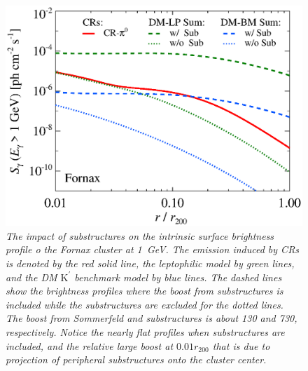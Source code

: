 \documentclass[10pt,aps,pra,reprint,amsmath,amsfonts,amssymb,showpacs,nofootinbib,floatfix]{revtex4-1}
\newcommand{\rmn}{\mathrm}
\newcommand{\Kp}{\rmn{K}^\prime}
\newcommand{\rvir}{r_{200}}
\begin{document}
\begin{figure}%
 \includegraphics[width=0.99\columnwidth]{figures/SB.resolved.v12.1GeV.SF300.noSuB.vs.SubMass.elmu.eps}
 \caption{\it The impact of substructures on the intrinsic surface
   brightness profile o the Fornax cluster at 1~GeV. The emission
   induced by CRs is denoted by the red solid line, the leptophilic
   model by green lines, and the DM $\Kp$ benchmark model by blue
   lines. The dashed lines show the brightness profiles where the
   boost from substructures is included while the substructures are
   excluded for the dotted lines. The boost from Sommerfeld and
   substructures is about 130 and 730, respectively. Notice the nearly
   flat profiles when substructures are included, and the relative
   large boost at $0.01\rvir$ that is due to projection of peripheral
   substructures onto the cluster center.}
 \label{fig:SB_sub}
\end{figure}
\end{document}
